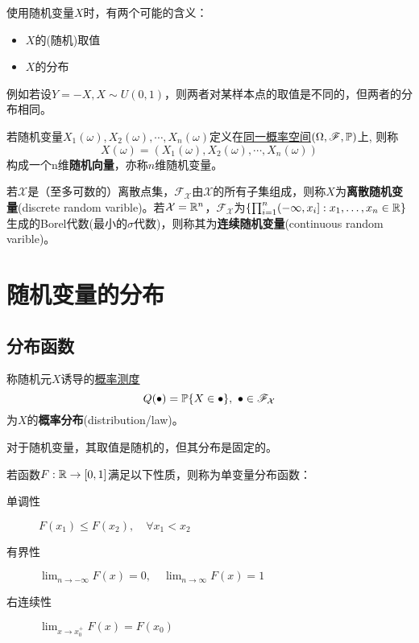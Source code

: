 \begin{remark}
    使用随机变量$X$时，有两个可能的含义：
    \begin{itemize}
        \item$X$的(随机)取值
        \item$X$的分布
    \end{itemize}
    例如若设$Y=-X, X \sim U(0,1)$，则两者对某样本点的取值是不同的，但两者的分布相同。
\end{remark}

\begin{definition}[随机向量]
    若随机变量$X_1(\omega), X_2(\omega),\cdots , X_n(\omega)$定义在\underline{同一概率空间}$(\Omega,\mathscr{F},\P)$上, 则称
    \[ X(\omega) = (X_1(\omega), X_2(\omega),\cdots , X_n(\omega)) \]
    构成一个n维\textbf{随机向量}，亦称$n$维随机变量。
\end{definition}

\begin{definition}[离散与连续随机变量]
    若$\mathcal{X}$是（至多可数的）离散点集，$\mathscr{F}_{\mathcal{X}}$由$\mathcal{X}$的所有子集组成，则称$X$为\textbf{离散随机变量}(discrete random varible)。若$\mathcal{X} = \R^{n}$，$\mathscr{F}_{\mathcal{X}}$为$\{\prod_{i=1}^{n}(-\infty,x_{i}] : x_{1},\dots,x_{n}\in\R\}$生成的Borel代数(最小的$\sigma$代数)，则称其为\textbf{连续随机变量}(continuous random varible)。
\end{definition}

\section{随机变量的分布}

\subsection{分布函数}

\begin{definition}[概率分布]
    称随机元$X$诱导的\underline{概率测度}
    \[ Q(\bullet)=\P\{X\in\bullet\},\ \bullet\in\mathscr{F}_{\mathcal{X}} \]
    为$X$的\textbf{概率分布}(distribution/law)。
\end{definition}
\begin{remark}
    对于随机变量，其取值是随机的，但其分布是固定的。
\end{remark}

\begin{definition}[单变量分布函数]
    若函数$F : \R \to [0,1] $满足以下性质，则称为单变量分布函数：
    \begin{description}
        \item[单调性] $F(x_1)\le F(x_2) , \quad \forall x_1<x_2$
        \item[有界性] $\lim_{n \to -\infty}F(x)=0, \quad \lim_{n \to \infty}F(x)=1$
        \item[右连续性] $\lim_{x \to x_0^+}F(x)=F(x_0)$
    \end{description}
\end{definition}

